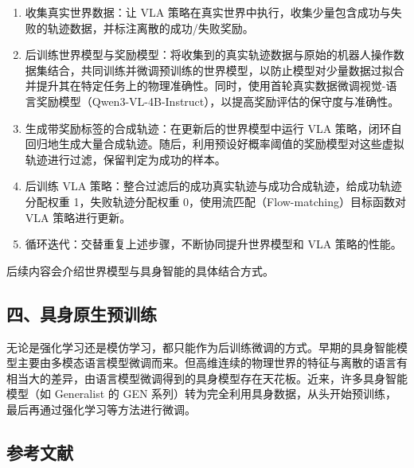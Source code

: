 \begin{enumerate}
\def\labelenumi{\arabic{enumi}.}
\tightlist
\item
  收集真实世界数据：让 VLA 策略在真实世界中执行，收集少量包含成功与失败的轨迹数据，并标注离散的成功/失败奖励。
\item
  后训练世界模型与奖励模型：将收集到的真实轨迹数据与原始的机器人操作数据集结合，共同训练并微调预训练的世界模型，以防止模型对少量数据过拟合并提升其在特定任务上的物理准确性。同时，使用首轮真实数据微调视觉-语言奖励模型（Qwen3-VL-4B-Instruct），以提高奖励评估的保守度与准确性。
\item
  生成带奖励标签的合成轨迹：在更新后的世界模型中运行 VLA 策略，闭环自回归地生成大量合成轨迹。随后，利用预设好概率阈值的奖励模型对这些虚拟轨迹进行过滤，保留判定为成功的样本。
\item
  后训练 VLA 策略：整合过滤后的成功真实轨迹与成功合成轨迹，给成功轨迹分配权重 1，失败轨迹分配权重 0，使用流匹配（Flow-matching）目标函数对 VLA 策略进行更新。
\item
  循环迭代：交替重复上述步骤，不断协同提升世界模型和 VLA 策略的性能。
\end{enumerate}

后续内容会介绍世界模型与具身智能的具体结合方式。

\hypertarget{ux56dbux5177ux8eabux539fux751fux9884ux8badux7ec3}{%
\subsection{四、具身原生预训练}\label{ux56dbux5177ux8eabux539fux751fux9884ux8badux7ec3}}

无论是强化学习还是模仿学习，都只能作为后训练微调的方式。早期的具身智能模型主要由多模态语言模型微调而来。但高维连续的物理世界的特征与离散的语言有相当大的差异，由语言模型微调得到的具身模型存在天花板。近来，许多具身智能模型（如 Generalist 的 GEN 系列）转为完全利用具身数据，从头开始预训练，最后再通过强化学习等方法进行微调。

\FloatBarrier
{}
\hypertarget{ux53c2ux8003ux6587ux732e-151}{%
\subsection{参考文献}\label{ux53c2ux8003ux6587ux732e-151}}

